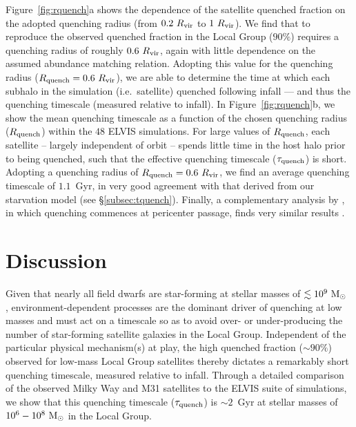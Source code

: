 Figure~\ref{fig:rquench}a shows the dependence of the satellite
quenched fraction on the adopted quenching radius (from $0.2~R_{\rm
  vir}$ to $1~R_{\rm vir}$). We find that to reproduce the observed
quenched fraction in the Local Group ($90\%$) requires a quenching
radius of roughly $0.6~R_{\rm vir}$, again with little dependence on
the assumed abundance matching relation. Adopting this value for the
quenching radius ($R_{\rm quench} = 0.6~R_{\rm vir}$), we are able to
determine the time at which each subhalo in the simulation
(i.e.~satellite) quenched following infall --- and thus the quenching
timescale (measured relative to infall). In Figure~\ref{fig:rquench}b,
we show the mean quenching timescale as a function of the chosen
quenching radius ($R_{\rm quench}$) within the $48$ ELVIS
simulations. For large values of $R_{\rm quench}$, each satellite --
largely independent of orbit -- spends little time in the host halo
prior to being quenched, such that the effective quenching timescale
($\tau_{\rm quench}$) is short. Adopting a quenching radius of $R_{\rm
  quench} = 0.6~R_{\rm vir}$, we find an average quenching timescale
of $1.1$~Gyr, in very good agreement with that derived from our
starvation model (see \S\ref{subsec:tquench}). Finally, a
complementary analysis by \citet{slater14}, in which quenching
commences at pericenter passage, finds very similar results
\citep[$\tau_{\rm quench} \sim 1-2$~Gyr, see also][]{weisz15, wetzel15b}.



\section{Discussion}
\label{sec:discussion}



Given that nearly all field dwarfs are star-forming at stellar masses
of $\lesssim 10^{9}~{\rm M}_{\odot}$ \citep{grebel97, mateo98, geha12},
environment-dependent processes are the dominant driver of quenching
at low masses and must act on a timescale so as to avoid over- or
under-producing the number of star-forming satellite galaxies in the
Local Group. Independent of the particular physical mechanism(s) at
play, the high quenched fraction ($\sim90\%$) observed for low-mass
Local Group satellites thereby dictates a remarkably short quenching
timescale, measured relative to infall. Through a detailed comparison
of the observed Milky Way and M31 satellites to the ELVIS suite of
simulations, we show that this quenching timescale ($\tau_{\rm
  quench}$) is $\sim 2$~Gyr at stellar masses of
$10^{6}-10^{8}~{\rm M}_{\odot}$ in the Local Group.

